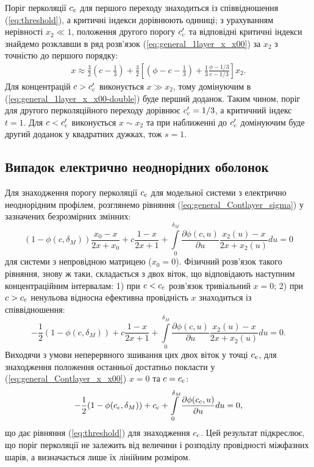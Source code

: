 \documentclass[14pt,twoside]{vakthesis}
\begin{document}
Поріг перколяції $c_{\rm c}$ для першого переходу знаходиться із співвідношення (\ref{eq:threshold}), а критичні індекси дорівнюють одиниці; з урахуванням нерівності $x_2 \ll 1$, положення другого порогу $c_{\rm c}'$ та відповідні критичні індекси знайдемо розклавши в ряд розв'язок (\ref{eq:general_1layer_x_x00}) за $x_2$ з точністю до першого порядку:
\begin{equation}\label{eq:general_1layer_x_x00-double}
\begin{split}
x \approx \frac{3}{2} \left(c - \frac{1}{3}\right) + \frac{3}{2}\left[ \left( \phi - c - \frac{1}{3} \right) + \frac{1}{3} \frac{\phi-1/3}{c-1/3} \right] x_2.
\end{split}
\end{equation}
Для концентрацій $c > c_{\rm c}'$ виконується $x\gg x_2$, тому домінуючим в (\ref{eq:general_1layer_x_x00-double}) буде перший доданок. Таким чином, поріг для другого перколяційного переходу дорівнює $c_{\rm c}'=1/3$, а критичний індекс $t=1$. Для $c<c_{\rm c}'$ виконується $x \sim x_2$ та при наближенні до $c_{\rm c}'$ домінуючим буде другий доданок у квадратних дужках, тож $s=1$. 


\subsection{Випадок електрично неоднорідних оболонок}

Для знаходження порогу перколяції $c_{\rm c}$ для модельної системи з електрично неоднорідним профілем, розглянемо рівняння (\ref{eq:general_Contlayer_sigma}) у зазначених безрозмірних змінних:
\begin{equation}\label{eq:general_Contlayer_x}
(1 - \phi(c,\delta_M)) \frac{x_0 - x}{2x + x_0}
+ c \frac{1 - x}{2x + 1}
+ \int\limits_0^{\delta_M} \frac{\partial \phi(c,u)}{\partial u} \frac{x_2 (u) - x}{2x + x_2 (u)} du = 0
\end{equation}
для системи з непровідною матрицею ($x_0 = 0$). Фізичний розв'язок такого рівняння, знову ж таки, складається з двох віток, що відповідають наступним концентраційним інтервалам: 1) при $c < c_{\rm c}$ розв'язок тривіальний $x=0$; 2) при $c > c_{\rm c}$ ненульова відносна ефективна провідність $x$ знаходиться із співвідношення:
\begin{equation}\label{eq:general_Contlayer_x_x00}
-\frac{1}{2}(1 - \phi(c,\delta_M)) 
+ c \frac{1 - x}{2x + 1}
+ \int\limits_0^{\delta_M} \frac{\partial \phi(c,u)}{\partial u} \frac{x_2 (u) - x}{2x + x_2 (u)} du = 0.
\end{equation}
Виходячи з умови неперервного зшивання цих двох віток у точці $c_{\rm c}$, для знаходження положення останньої достатньо покласти у (\ref{eq:general_Contlayer_x_x00}) $x=0$ та $c=c_{\rm c}$:
\begin{equation}\label{eq:general_Contlayer_x_x00-sew}
-\frac{1}{2}(1 - \phi(c_{\rm c},\delta_M)) 
+ c_{\rm c}
+ \int\limits_0^{\delta_M} \frac{\partial \phi(c_{\rm c},u)}{\partial u} du = 0,
\end{equation}
що дає рівняння (\ref{eq:threshold}) для знаходження $c_{\rm c}$.
Цей результат підкреслює, що поріг перколяції не залежить від величини і розподілу провідності міжфазних шарів, а визначається лише їх лінійним розміром.
\end{document}
